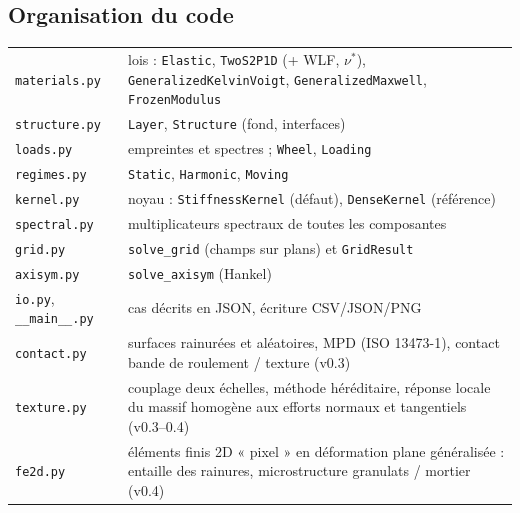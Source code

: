 \documentclass[11pt,a4paper]{article}
\begin{document}
\subsection{Organisation du code}
\begin{center}\small
\begin{tabular}{p{3.6cm}p{11.2cm}}
\toprule
\texttt{materials.py} & lois : \texttt{Elastic}, \texttt{TwoS2P1D} (+ WLF, $\nu^*$), \texttt{GeneralizedKelvinVoigt}, \texttt{GeneralizedMaxwell}, \texttt{FrozenModulus}\\
\texttt{structure.py} & \texttt{Layer}, \texttt{Structure} (fond, interfaces)\\
\texttt{loads.py} & empreintes et spectres ; \texttt{Wheel}, \texttt{Loading}\\
\texttt{regimes.py} & \texttt{Static}, \texttt{Harmonic}, \texttt{Moving}\\
\texttt{kernel.py} & noyau : \texttt{StiffnessKernel} (défaut), \texttt{DenseKernel} (référence)\\
\texttt{spectral.py} & multiplicateurs spectraux de toutes les composantes\\
\texttt{grid.py} & \texttt{solve\_grid} (champs sur plans) et \texttt{GridResult}\\
\texttt{axisym.py} & \texttt{solve\_axisym} (Hankel)\\
\texttt{io.py}, \texttt{\_\_main\_\_.py} & cas décrits en JSON, écriture CSV/JSON/PNG\\
\addlinespace
\texttt{contact.py} & surfaces rainurées et aléatoires, MPD (ISO 13473-1), contact bande de roulement / texture (v0.3)\\
\texttt{texture.py} & couplage deux échelles, méthode héréditaire, réponse locale du massif homogène aux efforts normaux et tangentiels (v0.3--0.4)\\
\texttt{fe2d.py} & éléments finis 2D « pixel » en déformation plane généralisée : entaille des rainures, microstructure granulats / mortier (v0.4)\\
\bottomrule
\end{tabular}
\end{center}
\end{document}
